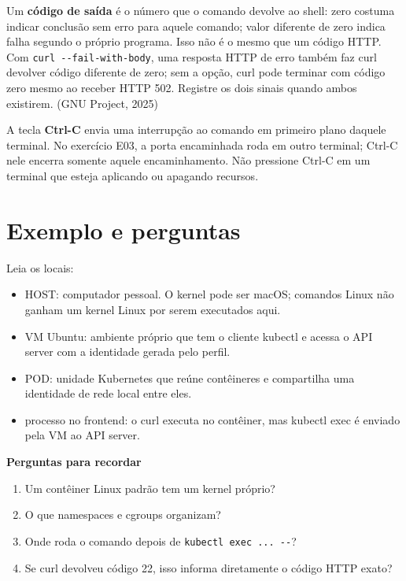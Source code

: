 \documentclass[12pt,openany,oneside,a4paper,chapter=TITLE,english,brazil]{abntex2}
\providecommand{\tightlist}{\setlength{\itemsep}{0pt}\setlength{\parskip}{0pt}}
\begin{document}
Um \textbf{código de saída} é o número que o comando devolve ao shell: zero costuma indicar conclusão sem erro para aquele comando; valor diferente de zero indica falha segundo o próprio programa. Isso não é o mesmo que um código HTTP. Com \texttt{curl -{}\allowbreak{}-{}\allowbreak{}fail-{}\allowbreak{}with-{}\allowbreak{}body}, uma resposta HTTP de erro também faz curl devolver código diferente de zero; sem a opção, curl pode terminar com código zero mesmo ao receber HTTP 502. Registre os dois sinais quando ambos existirem. (GNU Project, 2025)

A tecla \textbf{Ctrl-C} envia uma interrupção ao comando em primeiro plano daquele terminal. No exercício E03, a porta encaminhada roda em outro terminal; Ctrl-C nele encerra somente aquele encaminhamento. Não pressione Ctrl-C em um terminal que esteja aplicando ou apagando recursos.

\section{Exemplo e perguntas}\label{exemplo-e-perguntas}

Leia os locais:

\begin{itemize}
\tightlist
\item
  HOST: computador pessoal. O kernel pode ser macOS; comandos Linux não ganham um kernel Linux por serem executados aqui.
\item
  VM Ubuntu: ambiente próprio que tem o cliente kubectl e acessa o API server com a identidade gerada pelo perfil.
\item
  POD: unidade Kubernetes que reúne contêineres e compartilha uma identidade de rede local entre eles.
\item
  processo no frontend: o curl executa no contêiner, mas kubectl exec é enviado pela VM ao API server.
\end{itemize}

\textbf{Perguntas para recordar}

\begin{enumerate}
\def\labelenumi{\arabic{enumi}.}
\tightlist
\item
  Um contêiner Linux padrão tem um kernel próprio?
\item
  O que namespaces e cgroups organizam?
\item
  Onde roda o comando depois de \texttt{kubectl exec .\allowbreak{}.\allowbreak{}.\allowbreak{} -{}\allowbreak{}-{}\allowbreak{}}?
\item
  Se curl devolveu código 22, isso informa diretamente o código HTTP exato?
\end{enumerate}
\end{document}
